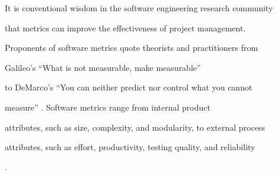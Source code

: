\documentclass[11pt,twocolumn]{article}
\begin{document}

\label{sec:intro}



It is conventional wisdom in the software engineering research community

that metrics can improve the effectiveness of project management.

Proponents of software metrics quote theorists and practitioners from

Galileo's ``What is not measurable, make measurable'' \cite{Finkelstein82}

to DeMarco's ``You can neither predict nor control what you cannot

measure'' \cite{DeMarco82}.  Software metrics range from internal product

attributes, such as size, complexity, and modularity, to external process

attributes, such as effort, productivity, testing quality, and reliability

\cite{Fenton97}. 













\end{document}
